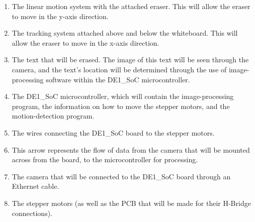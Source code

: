 \begin{enumerate}
	\item The linear motion system with the attached eraser. This will allow the eraser to move in the y-axis direction.
	\item The tracking system attached above and below the whiteboard. This will allow the eraser to move in the x-axis direction.
	\item The text that will be erased. The image of this text will be seen through the camera, and the text's location will be determined through the use of image-processing software within the DE1\_SoC microcontroller.
	\item The DE1\_SoC microcontroller, which will contain the image-processing program, the information on how to move the stepper motors, and the motion-detection program.
	\item The wires connecting the DE1\_SoC board to the stepper motors.
	\item This arrow represents the flow of data from the camera that will be mounted across from the board, to the microcontroller for processing.
	\item The camera that will be connected to the DE1\_SoC board through an Ethernet cable.
	\item The stepper motors (as well as the PCB that will be made for their H-Bridge connections). \\
\end{enumerate} \par


